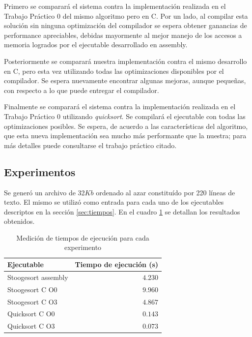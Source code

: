\documentclass[a4paper,11pt]{article}
\begin{document}
Primero se comparará el sistema contra la implementación realizada en el
Trabajo Práctico 0 del mismo algoritmo pero en C. Por un lado, al compilar esta
solución sin ninguna optimización del compilador se espera obtener ganancias de
performance apreciables, debidas mayormente al mejor manejo de los accesos a
memoria logrados por el ejecutable desarrollado en assembly.

Posteriormente se comparará nuestra implementación contra el mismo desarrollo
en C, pero esta vez utilizando todas las optimizaciones disponibles por el
compilador. Se espera nuevamente encontrar algunas mejoras, aunque pequeñas,
con respecto a lo que puede entregar el compilador.

Finalmente se comparará el sistema contra la implementación realizada en el
Trabajo Práctico 0 utilizando \textit{quicksort}. Se compilará el ejecutable
con todas las optimizaciones posibles. Se espera, de acuerdo a las
características del algoritmo, que esta nueva implementación sea mucho más
performante que la nuestra; para más detalles puede consultarse el trabajo
práctico citado.

\subsection{Experimentos}

Se generó un archivo de 32\(Kb\) ordenado al azar constituído por 220 líneas de
texto. El mismo se utilizó como entrada para cada uno de los ejecutables
descriptos en la sección \ref{sec:tiempos}. En el cuadro \ref{tab:resultados}
se detallan los resultados obtenidos.

\begin{table}[h!t]
\centering
\begin{tabular}{ | l | r | }
  \hline
  Ejecutable          & Tiempo de ejecución (s) \\ \hline
  Stoogesort assembly & \(4.230\) \\
  Stoogesort C O0     & \(9.960\) \\
  Stoogesort C O3     & \(4.867\) \\
  Quicksort C O0      & \(0.143\) \\
  Quicksort C O3      & \(0.073\) \\
  \hline
\end{tabular}
\caption{Medición de tiempos de ejecución para cada experimento}
\label{tab:resultados}
\end{table}

\FloatBarrier
\end{document}

